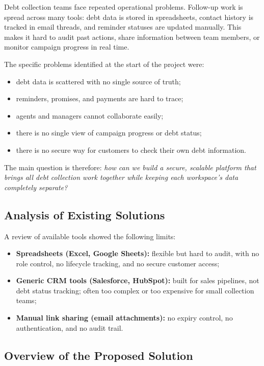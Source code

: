 \documentclass[12pt,a4paper]{report}
\begin{document}
Debt collection teams face repeated operational problems.
Follow-up work is spread across many tools: debt data is stored in spreadsheets,
contact history is tracked in email threads, and reminder statuses are updated
manually.
This makes it hard to audit past actions, share information between team members,
or monitor campaign progress in real time.

The specific problems identified at the start of the project were:
\begin{itemize}
  \item debt data is scattered with no single source of truth;
  \item reminders, promises, and payments are hard to trace;
  \item agents and managers cannot collaborate easily;
  \item there is no single view of campaign progress or debt status;
  \item there is no secure way for customers to check their own debt information.
\end{itemize}

The main question is therefore: \emph{how can we build a secure, scalable platform
that brings all debt collection work together while keeping each workspace's data
completely separate?}

\subsection{Analysis of Existing Solutions}

A review of available tools showed the following limits:
\begin{itemize}
  \item \textbf{Spreadsheets (Excel, Google Sheets):} flexible but hard to audit,
        with no role control, no lifecycle tracking, and no secure customer access;
  \item \textbf{Generic CRM tools (Salesforce, HubSpot):} built for sales pipelines,
        not debt status tracking; often too complex or too expensive for small
        collection teams;
  \item \textbf{Manual link sharing (email attachments):} no expiry control, no
        authentication, and no audit trail.
\end{itemize}

\subsection{Overview of the Proposed Solution}
\end{document}
